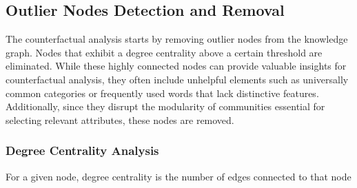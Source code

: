 \subsection{Outlier Nodes Detection and Removal}

The counterfactual analysis starts by removing outlier nodes from the knowledge
graph. Nodes that exhibit a degree centrality above a certain threshold are eliminated.
While these highly connected nodes can provide valuable insights for
counterfactual analysis, they often include unhelpful elements such as universally
common categories or frequently used words that lack distinctive features.
Additionally, since they disrupt the modularity of communities essential for selecting
relevant attributes, these nodes are removed.

\subsubsection*{Degree Centrality Analysis}
For a given node, degree centrality is the number of edges connected to that node
\parencite{bloch2023centrality}






